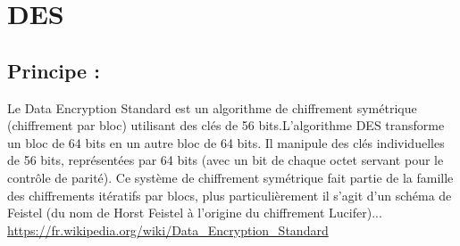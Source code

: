 \documentclass{article}
\begin{document}
\newpage
\section{DES}
\subsection{Principe :}
Le Data Encryption Standard est un algorithme de chiffrement symétrique (chiffrement par bloc) utilisant des clés de 56 bits.L'algorithme DES transforme un bloc de 64 bits en un autre bloc de 64 bits. Il manipule des clés individuelles de 56 bits, représentées par 64 bits (avec un bit de chaque octet servant pour le contrôle de parité). Ce système de chiffrement symétrique fait partie de la famille des chiffrements itératifs par blocs, plus particulièrement il s'agit d'un schéma de Feistel (du nom de Horst Feistel à l'origine du chiffrement Lucifer)... 
\url{https://fr.wikipedia.org/wiki/Data_Encryption_Standard}
\end{document}
